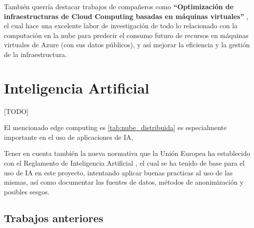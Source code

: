 También querría destacar trabajos de compañeros como \textbf{``Optimización de infraestructuras de Cloud Computing basadas en máquinas virtuales''} \citep{sanchez2023optimizacion}, el cual hace una excelente labor de investigación de todo lo relacionado con la computación en la nube para predecir el consumo futuro de recursos en máquinas virtuales de Azure (con sus datos públicos), y así mejorar la eficiencia y la gestión de la infraestructura.

\section{Inteligencia Artificial}
\label{sec:EstudiosIA}

[TODO]


El mencionado edge computing es \ref{tab:nube_distribuida} es especialmente importante en el uso de aplicaciones de IA,

Tener en cuenta también la nueva normativa que la Unión Europea ha establecido con el Reglamento de Inteligencia Artificial \citep{webRIA2024Europa}, el cual se ha tenido de base para el uso de IA en este proyecto, intentando aplicar buenas practicas al uso de las mismas, así como documentar las fuentes de datos, métodos de anonimización y posibles sesgos.
	
	\subsection{Trabajos anteriores}


